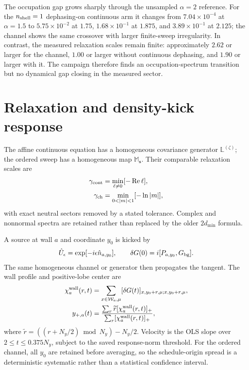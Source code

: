 \documentclass[aps,prb,twocolumn,nofootinbib,superscriptaddress,floatfix]{revtex4-2}
\begin{document}
The occupation gap grows sharply through the unsampled $\alpha=2$ reference.  For the
$n_{\rm shell}=1$ dephasing-on continuous arm it changes from
$7.04\times10^{-4}$ at $\alpha=1.5$ to $5.75\times10^{-2}$ at $1.75$,
$1.68\times10^{-1}$ at $1.875$, and $3.89\times10^{-1}$ at $2.125$; the channel shows
the same crossover with larger finite-sweep irregularity.  In contrast, the measured
relaxation scales remain finite: approximately $2.62$ or larger for the channel,
$1.00$ or larger without continuous dephasing, and $1.90$ or larger with it.  The
campaign therefore finds an occupation-spectrum transition but no dynamical gap
closing in the measured sector.

\section{Relaxation and density-kick response}

The affine continuous equation has a homogeneous covariance generator
$\mathbb L^{(\zeta)}$; the ordered sweep has a homogeneous map $\mathbb M_{\boldsymbol s}$.
Their comparable relaxation scales are
\begin{align}
 \gamma_{\rm cont}&=\min_{\ell\ne0}[-\operatorname{Re}\ell],\\
 \gamma_{\rm ch}&=\min_{0<|m|<1}[-\ln|m|],
\end{align}
with exact neutral sectors removed by a stated tolerance.  Complex and nonnormal
spectra are retained rather than replaced by the older $2d_{\min}$ formula.

A source at wall $a$ and coordinate $y_0$ is kicked by
\begin{equation}
 \hat U_\epsilon=\exp[-i\epsilon\hat n_{a,y_0}],\qquad
 \delta G(0)=i[P_{a,y_0},G_{\rm bg}].
\end{equation}
The same homogeneous channel or generator then propagates the tangent.  The wall profile
and positive-lobe center are
\begin{align}
 \chi_a^{\rm wall}(r,t)&=\sum_{x\in\mathcal W_a,\mu}
 [\delta G(t)]_{x,y_0+r,\mu;x,y_0+r,\mu},\\
 y_{+,a}(t)&=\frac{\sum_r\widetilde r[\chi_a^{\rm wall}(r,t)]_+}
 {\sum_r[\chi_a^{\rm wall}(r,t)]_+},
\end{align}
where $\widetilde r=((r+N_y/2)\bmod N_y)-N_y/2$.  Velocity is the OLS slope over
$2\le t\le0.375N_y$, subject to the saved response-norm threshold.  For the ordered
channel, all $y_0$ are retained before averaging, so the schedule-origin spread is a
deterministic systematic rather than a statistical confidence interval.
\end{document}
